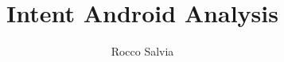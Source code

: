 \documentclass[]{report}
\title{Intent Android Analysis}
\author{Rocco Salvia}
\begin{document}
\maketitle

\begin{abstract}
\end{abstract}

\tableofcontents







\end{document}
